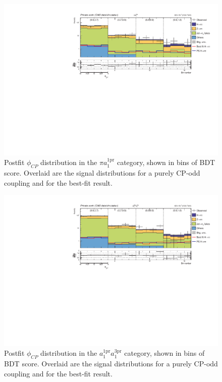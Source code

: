 \begin{figure}[!htbp]
    \centering
    \includegraphics[width=1\textwidth]{Figures/Chapter7/postfit/htt_tt_10_13p6TeV.pdf}
    \caption[Postfit $\phi_{CP}$ distribution in the $\pi a_1^\text{1pr}$ category.]
    {Postfit $\phi_{CP}$ distribution in the $\pi a_1^\text{1pr}$ category, shown in bins of \ac{BDT} score. Overlaid are the signal distributions for a purely CP-odd coupling and for the best-fit result.}
    \label{Figure:Chapter7_Postfit_Unrolled_8}
\end{figure}

\begin{figure}[!htbp]
    \centering
    \includegraphics[width=1\textwidth]{Figures/Chapter7/postfit/htt_tt_11_13p6TeV.pdf}
    \caption[Postfit $\phi_{CP}$ distribution in the $a_1^\text{1pr}a_1^\text{3pr}$ category.]
    {Postfit $\phi_{CP}$ distribution in the $a_1^\text{1pr}a_1^\text{3pr}$ category, shown in bins of \ac{BDT} score. Overlaid are the signal distributions for a purely CP-odd coupling and for the best-fit result.}
    \label{Figure:Chapter7_Postfit_Unrolled_9}
\end{figure}

